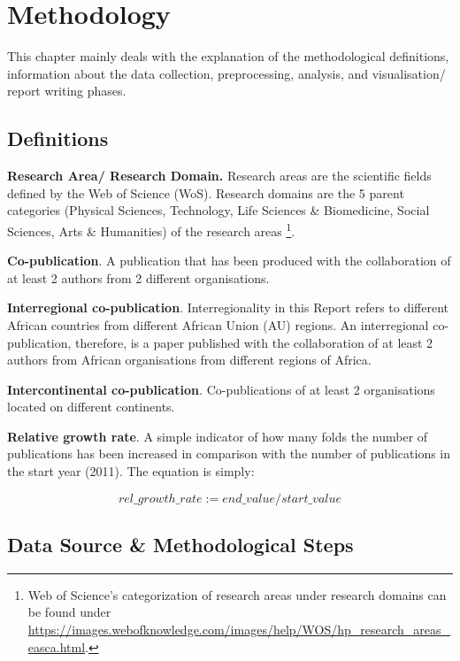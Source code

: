 \documentclass[
]{book}
\begin{document}
\hypertarget{method}{%
\chapter{Methodology}\label{method}}

This chapter mainly deals with the explanation of the methodological definitions, information about the data collection, preprocessing, analysis, and visualisation/ report writing phases.

\hypertarget{definitions}{%
\section{Definitions}\label{definitions}}

\textbf{Research Area/ Research Domain.} Research areas are the scientific fields defined by the Web of Science (WoS). Research domains are the 5 parent categories (Physical Sciences, Technology, Life Sciences \& Biomedicine, Social Sciences, Arts \& Humanities) of the research areas \footnote{Web of Science's categorization of research areas under research domains can be found under \url{https://images.webofknowledge.com/images/help/WOS/hp_research_areas_easca.html}.}.

\textbf{Co-publication}. A publication that has been produced with the collaboration of at least 2 authors from 2 different organisations.

\textbf{Interregional co-publication}. Interregionality in this Report refers to different African countries from different African Union (AU) regions. An interregional co-publication, therefore, is a paper published with the collaboration of at least 2 authors from African organisations from different regions of Africa.

\textbf{Intercontinental co-publication}. Co-publications of at least 2 organisations located on different continents.

\textbf{Relative growth rate}. A simple indicator of how many folds the number of publications has been increased in comparison with the number of publications in the start year (2011). The equation is simply:

\[
rel\_growth\_rate := end\_value/start\_value
\]

\hypertarget{data-source-methodological-steps}{%
\section{Data Source \& Methodological Steps}\label{data-source-methodological-steps}}
\end{document}
